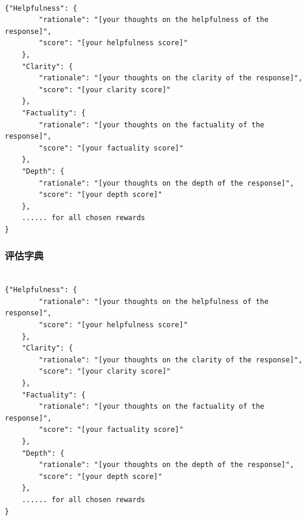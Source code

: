 \label{sec:eval_dict}  
\begin{lstlisting}[breaklines=true,breakatwhitespace=true]

{"Helpfulness": {
        "rationale": "[your thoughts on the helpfulness of the response]",
        "score": "[your helpfulness score]"
    },
    "Clarity": {
        "rationale": "[your thoughts on the clarity of the response]",
        "score": "[your clarity score]"
    },
    "Factuality": {
        "rationale": "[your thoughts on the factuality of the response]",
        "score": "[your factuality score]"
    },
    "Depth": {
        "rationale": "[your thoughts on the depth of the response]",
        "score": "[your depth score]"
    },
    ...... for all chosen rewards
}

\end{lstlisting}  \subsubsection{评估字典}  
\label{sec:eval_dict}  
\begin{lstlisting}[breaklines=true,breakatwhitespace=true]

{"Helpfulness": {
        "rationale": "[your thoughts on the helpfulness of the response]",
        "score": "[your helpfulness score]"
    },
    "Clarity": {
        "rationale": "[your thoughts on the clarity of the response]",
        "score": "[your clarity score]"
    },
    "Factuality": {
        "rationale": "[your thoughts on the factuality of the response]",
        "score": "[your factuality score]"
    },
    "Depth": {
        "rationale": "[your thoughts on the depth of the response]",
        "score": "[your depth score]"
    },
    ...... for all chosen rewards
}

\end{lstlisting}
